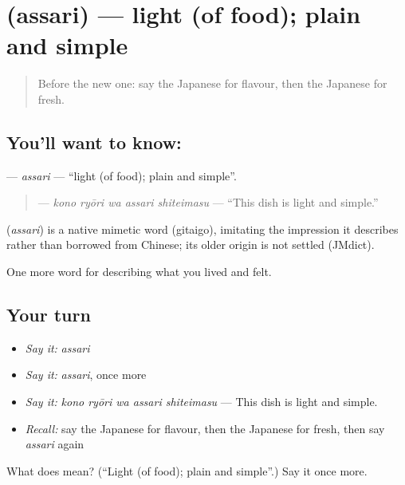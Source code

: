 \section[\texorpdfstring{\ja{あっさり} (assari)}{あっさり (assari)}]{ (assari) — light (of food); plain and simple}

\label{lesson:JA-C495-assari}



\begin{quote}
Before the new one: say the Japanese for flavour, then the Japanese for fresh.
\end{quote}

\subsection*{You'll want to know: }
\textbf{} — \emph{assari} — \textquotedblleft{}light (of food); plain and simple\textquotedblright{}.

\begin{quote}
\textbf{  } — \emph{kono ryōri wa assari shiteimasu} — \textquotedblleft{}This dish is light and simple.\textquotedblright{}
\end{quote}

\begin{cousinweb}
\textbf{} (\emph{assari}) is a native mimetic word (gitaigo), imitating the impression it describes rather than borrowed from Chinese; its older origin is not settled (JMdict).
\end{cousinweb}

\begin{grammarlens}[title={What you've built}]
One more word for describing what you lived and felt.
\end{grammarlens}

\subsection*{Your turn}
\begin{itemize}
\raggedright
  \item \emph{Say it:} \emph{assari}
  \item \emph{Say it:} \emph{assari}, once more
  \item \emph{Say it:} \emph{kono ryōri wa assari shiteimasu} — This dish is light and simple.
  \item \emph{Recall:} say the Japanese for flavour, then the Japanese for fresh, then say \emph{assari} again
\end{itemize}

\begin{tcolorbox}[breakable,colback=teal!4,colframe=teal!35!black,title={Before you move on}]
What does  mean? (\textquotedblleft{}Light (of food); plain and simple\textquotedblright{}.) Say it once more.
\end{tcolorbox}

